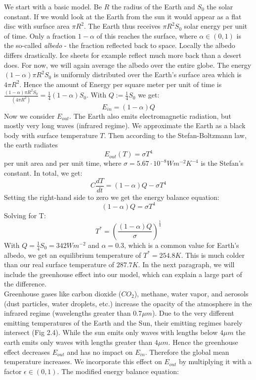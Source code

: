 \documentclass[%
thesis=student,%
coverpage=false,%
titlepage=false,%
headmarks=true, %
english,%
font=libertine, %
math=newpxtx, %
BCOR=5mm,%
coverBCOR=11mm%
]{tumbook}
\begin{document}
We start with a basic model.
Be $R$ the radius of the Earth and $S_{0}$ the solar constant. If we would look at the Earth from the sun it would appear as a flat disc with surface area $\pi R^2$. The Earth thus receives $\pi R^2 S_{0}$ solar energy per unit of time. Only a fraction $1-\alpha$ of this reaches the surface, where $\alpha \in (0,1)$ is the so-called \textit{albedo} - the fraction reflected back to space. Locally the albedo differs drastically. Ice sheets for example reflect much more back than a desert does. For now, we will again average the albedo over the entire globe. The energy $(1-\alpha)\pi R^2S_{0}$ is uniformly distributed over the Earth's surface area which is $4\pi R^2$. Hence the amount of Energy per square meter per unit of time is $\frac{(1-\alpha)\pi R^2S_{0}}{(4\pi R^2)} = \frac{1}{4}(1-\alpha)S_{0}$. With $Q:=\frac{1}{4}S_{0}$ we get: 
\begin{equation}
    E_{in} = (1-\alpha)Q
\end{equation}
Now we consider $E_{out}$. The Earth also emits electromagnetic radiation, but mostly very long waves (infrared regime). We approximate the Earth as a black body with surface temperature $T$. Then according to the Stefan-Boltzmann law, the earth radiates 
\begin{equation}
    E_{out}(T) = \sigma T^4
\end{equation}
per unit area and per unit time, where $\sigma = 5.67 \cdot 10^{-8}Wm^{-2}K^{-4}$ is the Stefan's constant. In total, we get: 
\begin{equation}
    C\frac{dT}{dt} = (1-\alpha)Q - \sigma T^4
    \label{temperature independent albedo EBM}
\end{equation}
Setting the right-hand side to zero we get the energy balance equation: 
\begin{equation}
    (1-\alpha)Q = \sigma T^4
\end{equation}
Solving for T: 
\begin{equation}
    T^* = (\frac{(1-\alpha)Q}{\sigma})^\frac{1}{4}
\end{equation}
With $Q = \frac{1}{4}S_{0}= 342 Wm^{-2}$ and $\alpha = 0.3$, which is a common value for Earth's albedo, we get an equilibrium temperature of $T^* = 254.8K$. This is much colder than our real surface temperature of $287.7K$. In the next paragraph, we will include the greenhouse effect into our model, which can explain a large part of the difference.
\\ 
Greenhouse gases like carbon dioxide ($CO_{2}$), methane, water vapor, and aerosols (dust particles, water droplets, etc.) increase the opacity of the atmosphere in the infrared regime (wavelengths greater than $0.7 \mu m$). Due to the very different emitting temperatures of the Earth and the Sun, their emitting regimes barely intersect (Fig 2.4). While the sun emits only waves with lengths below $4 \mu m$ the earth emits only waves with lengths greater than $4 \mu m$. Hence the greenhouse effect decreases $E_{out}$ and has no impact on $E_{in}$. Therefore the global mean temperature increases. We incorporate this effect on $E_{out}$ by multiplying it with a factor $\epsilon \in (0,1)$. The modified energy balance equation: 
\end{document}
